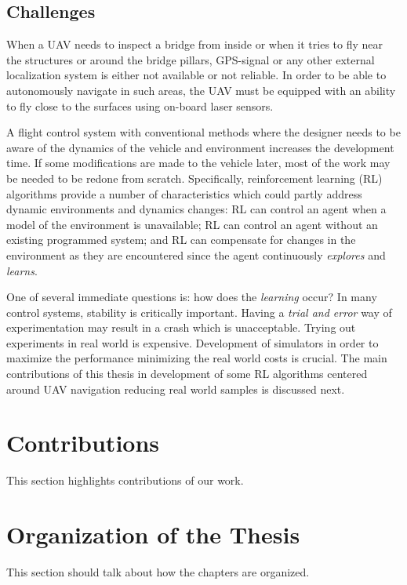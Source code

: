 \documentclass[12pt]{report}
\begin{document}
\subsection{Challenges}
When a UAV needs to inspect a bridge from inside or when it tries to fly near the structures or around the bridge pillars, GPS-signal or any other external localization system is either not available or not reliable. In order to be able to autonomously navigate in such areas, the UAV must be equipped with an ability to fly close to the surfaces using on-board laser sensors.\par
A flight control system with conventional methods where the designer needs to be aware of the dynamics of the vehicle and environment increases the development time. If some modifications are made to the vehicle later, most of the work may be needed to be redone from scratch. Specifically, reinforcement learning (RL) algorithms provide a number of characteristics which
could partly address dynamic environments and dynamics changes: RL can control
an agent when a model of the environment is unavailable; RL can control an agent without an
existing programmed system; and RL can compensate for changes in the environment
as they are encountered since the agent continuously \textit{explores} and \textit{learns}.

One of several immediate questions is: how does the \textit{learning} occur? In many control systems, stability is critically important. Having a \textit{trial and error} way of experimentation may result in a crash which is unacceptable. Trying out experiments in real world is expensive. Development of simulators in order to maximize the performance minimizing the real world costs is crucial. The main contributions of this thesis in development of some RL algorithms centered around UAV navigation reducing real world samples is discussed next.

\section{Contributions}

This section highlights contributions of our work.


\section{Organization of the Thesis}

This section should talk about how the chapters are organized.
\end{document}

